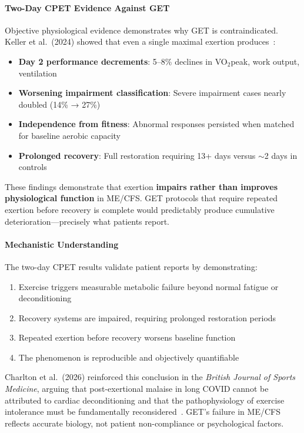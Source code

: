 \paragraph{Two-Day CPET Evidence Against GET}

Objective physiological evidence demonstrates why GET is contraindicated. Keller et al.\ (2024) showed that even a single maximal exertion produces~\cite{keller2024cpet}:

\begin{itemize}
    \item \textbf{Day 2 performance decrements}: 5--8\% declines in VO$_2$peak, work output, ventilation
    \item \textbf{Worsening impairment classification}: Severe impairment cases nearly doubled (14\% → 27\%)
    \item \textbf{Independence from fitness}: Abnormal responses persisted when matched for baseline aerobic capacity
    \item \textbf{Prolonged recovery}: Full restoration requiring 13+ days versus $\sim$2 days in controls
\end{itemize}

These findings demonstrate that exertion \textbf{impairs rather than improves physiological function} in ME/CFS. GET protocols that require repeated exertion before recovery is complete would predictably produce cumulative deterioration---precisely what patients report.

\paragraph{Mechanistic Understanding}

The two-day CPET results validate patient reports by demonstrating:
\begin{enumerate}
    \item Exercise triggers measurable metabolic failure beyond normal fatigue or deconditioning
    \item Recovery systems are impaired, requiring prolonged restoration periods
    \item Repeated exertion before recovery worsens baseline function
    \item The phenomenon is reproducible and objectively quantifiable
\end{enumerate}

Charlton et al.\ (2026) reinforced this conclusion in the \textit{British Journal of Sports Medicine}, arguing that post-exertional malaise in long COVID cannot be attributed to cardiac deconditioning and that the pathophysiology of exercise intolerance must be fundamentally reconsidered~\cite{Charlton2026pem}. GET's failure in ME/CFS reflects accurate biology, not patient non-compliance or psychological factors.

